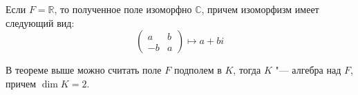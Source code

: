 \begin{corollary}
	Если $F = \mathbb{R}$, то полученное поле изоморфно $\mathbb{C}$, причем изоморфизм имеет следующий вид:
	\[\begin{pmatrix}
	a & b\\
	-b & a
	\end{pmatrix} \mapsto a +bi\]
\end{corollary}

\begin{note}
	В теореме выше можно считать поле $F$ подполем в $K$, тогда $K$ "--- алгебра над $F$, причем $\dim{K} = 2$.
\end{note}